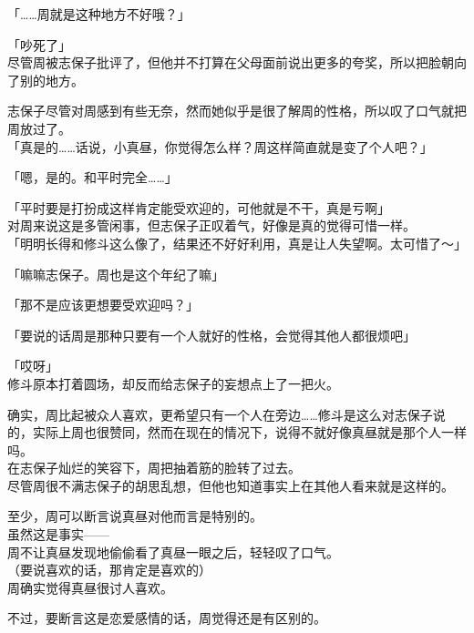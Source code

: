 「……周就是这种地方不好哦？」

「吵死了」\\

尽管周被志保子批评了，但他并不打算在父母面前说出更多的夸奖，所以把脸朝向了别的地方。

志保子尽管对周感到有些无奈，然而她似乎是很了解周的性格，所以叹了口气就把周放过了。\\

「真是的……话说，小真昼，你觉得怎么样？周这样简直就是变了个人吧？」

「嗯，是的。和平时完全……」

「平时要是打扮成这样肯定能受欢迎的，可他就是不干，真是亏啊」\\

对周来说这是多管闲事，但志保子正叹着气，好像是真的觉得可惜一样。\\

「明明长得和修斗这么像了，结果还不好好利用，真是让人失望啊。太可惜了～」

「嘛嘛志保子。周也是这个年纪了嘛」

「那不是应该更想要受欢迎吗？」

「要说的话周是那种只要有一个人就好的性格，会觉得其他人都很烦吧」

「哎呀」\\

修斗原本打着圆场，却反而给志保子的妄想点上了一把火。

确实，周比起被众人喜欢，更希望只有一个人在旁边……修斗是这么对志保子说的，实际上周也很赞同，然而在现在的情况下，说得不就好像真昼就是那个人一样吗。\\

在志保子灿烂的笑容下，周把抽着筋的脸转了过去。\\

尽管周很不满志保子的胡思乱想，但他也知道事实上在其他人看来就是这样的。

至少，周可以断言说真昼对他而言是特别的。\\

虽然这是事实——\\

周不让真昼发现地偷偷看了真昼一眼之后，轻轻叹了口气。\\

（要说喜欢的话，那肯定是喜欢的）\\

周确实觉得真昼很讨人喜欢。

不过，要断言这是恋爱感情的话，周觉得还是有区别的。\\

